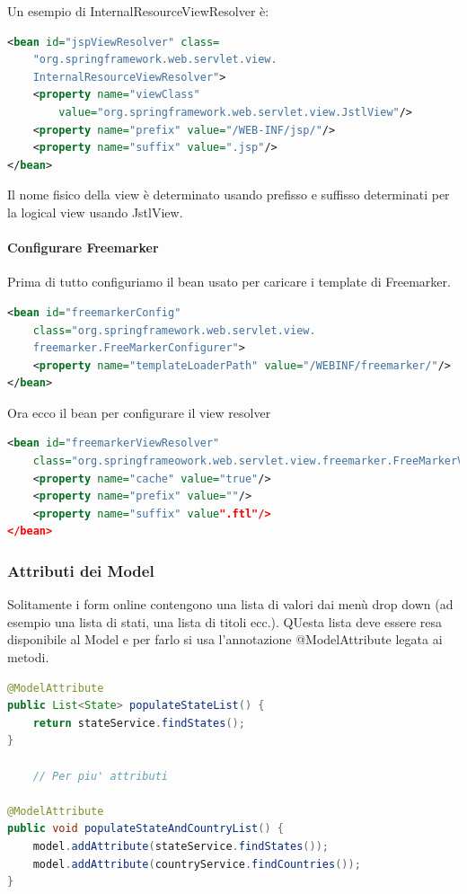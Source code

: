 \documentclass[11pt,a4paper]{book}
\begin{document}
Un esempio di InternalResourceViewResolver è:
\begin{lstlisting}[language = XML]
<bean id="jspViewResolver" class=
	"org.springframework.web.servlet.view.
	InternalResourceViewResolver">
	<property name="viewClass"
		value="org.springframework.web.servlet.view.JstlView"/>
	<property name="prefix" value="/WEB-INF/jsp/"/>
	<property name="suffix" value=".jsp"/>
</bean>
\end{lstlisting}
Il nome fisico della view è determinato usando prefisso e suffisso determinati per la logical view usando JstlView.

\paragraph{Configurare Freemarker}
Prima di tutto configuriamo il bean usato per caricare i template di Freemarker.
\begin{lstlisting}[language = XML]
<bean id="freemarkerConfig"
	class="org.springframework.web.servlet.view.
	freemarker.FreeMarkerConfigurer">
	<property name="templateLoaderPath" value="/WEBINF/freemarker/"/>
</bean>
\end{lstlisting}

Ora ecco il bean per configurare il view resolver
\begin{lstlisting}[language = XML]
<bean id="freemarkerViewResolver"
	class="org.springframeowork.web.servlet.view.freemarker.FreeMarkerViewResolver">
	<property name="cache" value="true"/>
	<property name="prefix" value=""/>
	<property name="suffix" value".ftl"/>
</bean>
\end{lstlisting}

\subsubsection{Attributi dei Model}
Solitamente i form online contengono una lista di valori dai menù drop down (ad esempio una lista di stati, una lista di titoli ecc.). QUesta lista deve essere resa disponibile al Model e per farlo si usa l'annotazione @ModelAttribute legata ai metodi.
\begin{lstlisting}[language = Java]
@ModelAttribute
public List<State> populateStateList() {
	return stateService.findStates();
}

	// Per piu' attributi

@ModelAttribute
public void populateStateAndCountryList() {
	model.addAttribute(stateService.findStates());
	model.addAttribute(countryService.findCountries());
}
\end{lstlisting}
\end{document}
